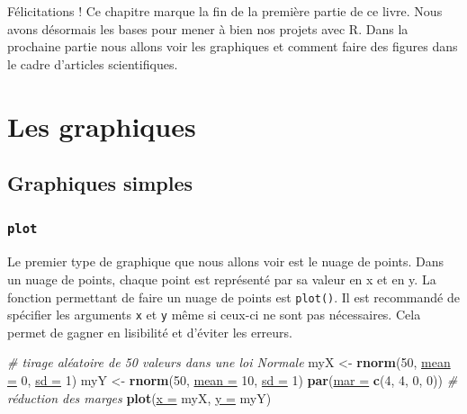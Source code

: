 \documentclass[twoside,symmetric]{book}
\newenvironment{Shaded}{}{}
\newcommand{\CommentTok}[1]{\textit{#1}}
\newcommand{\DataTypeTok}[1]{\underline{#1}}
\newcommand{\DecValTok}[1]{#1}
\newcommand{\KeywordTok}[1]{\textbf{#1}}
\newcommand{\NormalTok}[1]{#1}
\newcommand{\StringTok}[1]{#1}
\begin{document}
Félicitations ! Ce chapitre marque la fin de la première partie de ce livre. Nous avons désormais les bases pour mener à bien nos projets avec R. Dans la prochaine partie nous allons voir les graphiques et comment faire des figures dans le cadre d'articles scientifiques.

\hypertarget{part-les-graphiques}{%
\part{Les graphiques}\label{part-les-graphiques}}

\hypertarget{graph1}{%
\chapter{Graphiques simples}\label{graph1}}

\minitoc

\hypertarget{graph1plot}{%
\section{\texorpdfstring{\texttt{plot}}{plot}}\label{graph1plot}}

Le premier type de graphique que nous allons voir est le nuage de points. Dans un nuage de points, chaque point est représenté par sa valeur en x et en y. La fonction permettant de faire un nuage de points est \texttt{plot()}. Il est recommandé de spécifier les arguments \texttt{x} et \texttt{y} même si ceux-ci ne sont pas nécessaires. Cela permet de gagner en lisibilité et d'éviter les erreurs.

\begin{Shaded}
\begin{Highlighting}[]
\CommentTok{# tirage aléatoire de 50 valeurs dans une loi Normale}
\NormalTok{myX <-}\StringTok{ }\KeywordTok{rnorm}\NormalTok{(}\DecValTok{50}\NormalTok{, }\DataTypeTok{mean =} \DecValTok{0}\NormalTok{, }\DataTypeTok{sd =} \DecValTok{1}\NormalTok{) }
\NormalTok{myY <-}\StringTok{ }\KeywordTok{rnorm}\NormalTok{(}\DecValTok{50}\NormalTok{, }\DataTypeTok{mean =} \DecValTok{10}\NormalTok{, }\DataTypeTok{sd =} \DecValTok{1}\NormalTok{)}
\KeywordTok{par}\NormalTok{(}\DataTypeTok{mar =} \KeywordTok{c}\NormalTok{(}\DecValTok{4}\NormalTok{, }\DecValTok{4}\NormalTok{, }\DecValTok{0}\NormalTok{, }\DecValTok{0}\NormalTok{)) }\CommentTok{# réduction des marges}
\KeywordTok{plot}\NormalTok{(}\DataTypeTok{x =}\NormalTok{ myX, }\DataTypeTok{y =}\NormalTok{ myY)}
\end{Highlighting}
\end{Shaded}
\end{document}
